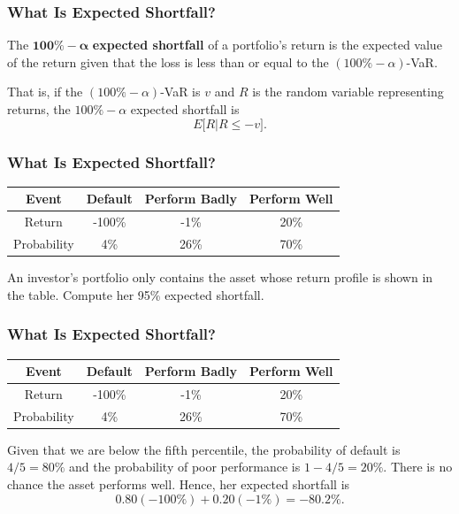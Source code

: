 \documentclass{beamer}
\begin{document}
\begin{frame}
\frametitle{What Is Expected Shortfall?}
The $\boldsymbol{100\% - \alpha}$ \textbf{expected shortfall} of a portfolio's return is the expected value of the return given that the loss is less than or equal to the $(100\% - \alpha)$-VaR. 
\bigskip

That is, if the $(100\% - \alpha)$-VaR is $v$ and  $R$ is the random variable representing returns, the $100\% - \alpha$ expected shortfall is
$$
E\Big[R\Big| R \leq -v\Big].
$$
\end{frame}

\begin{frame}
\frametitle{What Is Expected Shortfall?}
\begin{center}
\begin{tabular}{| c | c c c |}
\hline
Event		&	Default	&	Perform Badly	&	Perform Well		\\\hline
Return	&	-100\%	&	-1\%			&	20\%			\\
Probability	&	4\%		&	26\%			&	70\%			\\\hline
\end{tabular}
\end{center}
\begin{example}
An investor's portfolio only contains the asset whose return profile is shown in the table. Compute her 95\% expected shortfall.
\end{example}
\end{frame}


\begin{frame}
\frametitle{What Is Expected Shortfall?}
\begin{center}
\begin{tabular}{| c | c c c |}
\hline
Event		&	Default	&	Perform Badly	&	Perform Well		\\\hline
Return	&	-100\%	&	-1\%			&	20\%			\\
Probability	&	4\%		&	26\%			&	70\%			\\\hline
\end{tabular}
\end{center}
\begin{solution}
Given that we are below the fifth percentile, the probability of default is $4/5 = 80\%$ and the probability of poor performance is $1 - 4/5 = 20\%$. There is no chance the asset performs well. Hence, her expected shortfall is
$$
0.80(-100\%) + 0.20(-1\%) = -80.2\%.
$$
\end{solution}

\end{frame}
\end{document}
